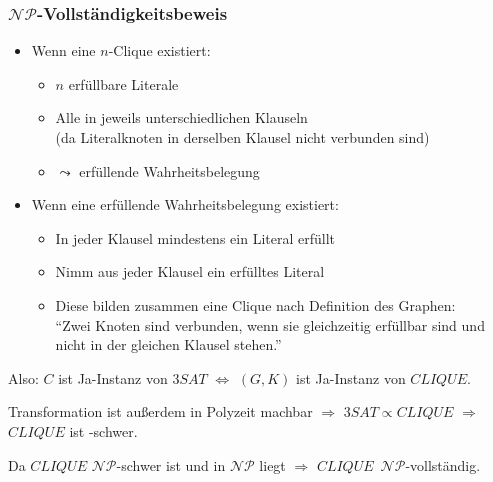 \begin{frame}
\frametitle{$\mathcal{NP}$-Vollständigkeitsbeweis}
\begin{itemize}
\item Wenn eine $n$-Clique existiert:
\begin{itemize}
	\item $n$ erfüllbare Literale
	\item Alle in jeweils unterschiedlichen Klauseln \\ \small{(da Literalknoten in derselben Klausel nicht verbunden sind)}
	\item $\leadsto$ erfüllende Wahrheitsbelegung
\end{itemize}
\pause \item Wenn eine erfüllende Wahrheitsbelegung existiert:
\begin{itemize}
	\item In jeder Klausel mindestens ein Literal erfüllt
	\item Nimm aus jeder Klausel ein erfülltes Literal
	\item Diese bilden zusammen eine Clique nach Definition des Graphen: \\ \small{"`Zwei Knoten sind verbunden, wenn sie gleichzeitig erfüllbar sind und nicht in der gleichen Klausel stehen."'}
\end{itemize}
\end{itemize}

\pause

Also: $C$ ist Ja-Instanz von $3SAT$ $\Leftrightarrow$ $(G,K)$ ist Ja-Instanz von $CLIQUE$.

\pause

\ducttape{.3cm}

Transformation ist außerdem in Polyzeit machbar $\Rightarrow$ $3SAT \propto CLIQUE$ $\Rightarrow$ $CLIQUE$ ist \classNP{}-schwer.

\pause

\ducttape{.3cm}

Da $CLIQUE$ $\mathcal{NP}$-schwer ist und in $\mathcal{NP}$ liegt $\Rightarrow$ $CLIQUE$~$\mathcal{NP}$-vollständig.
\end{frame}

